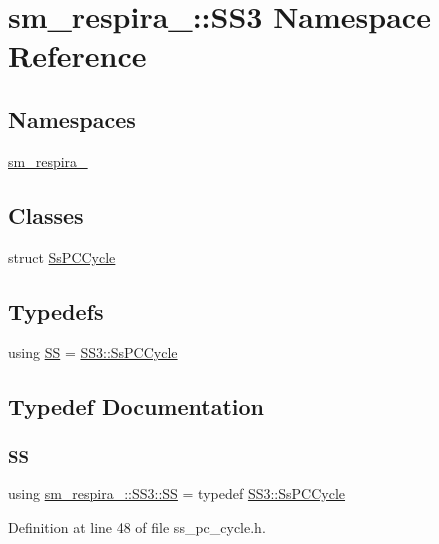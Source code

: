 \hypertarget{namespacesm__respira__1_1_1SS3}{}\section{sm\+\_\+respira\+\_\+:\+:S\+S3 Namespace Reference}
\label{namespacesm__respira__1_1_1SS3}
\subsection*{Namespaces}
\begin{DoxyCompactItemize}
\item 
 \hyperlink{namespacesm__respira__1_1_1SS3_1_1sm__respira__1}{sm\+\_\+respira\+\_}
\end{DoxyCompactItemize}
\subsection*{Classes}
\begin{DoxyCompactItemize}
\item 
struct \hyperlink{structsm__respira__1_1_1SS3_1_1SsPCCycle}{Ss\+P\+C\+Cycle}
\end{DoxyCompactItemize}
\subsection*{Typedefs}
\begin{DoxyCompactItemize}
\item 
using \hyperlink{namespacesm__respira__1_1_1SS3_aca7eacdb113aa4d7f626c75721a4899b}{SS} = \hyperlink{structsm__respira__1_1_1SS3_1_1SsPCCycle}{S\+S3\+::\+Ss\+P\+C\+Cycle}
\end{DoxyCompactItemize}


\subsection{Typedef Documentation}
\mbox{\label{namespacesm__respira__1_1_1SS3_aca7eacdb113aa4d7f626c75721a4899b}} 
\subsubsection{\texorpdfstring{SS}{SS}}
{\footnotesize\ttfamily using \hyperlink{namespacesm__respira__1_1_1SS3_aca7eacdb113aa4d7f626c75721a4899b}{sm\+\_\+respira\+\_\+::\+S\+S3\+::\+SS} = typedef \hyperlink{structsm__respira__1_1_1SS3_1_1SsPCCycle}{S\+S3\+::\+Ss\+P\+C\+Cycle}}



Definition at line 48 of file ss\+\_\+pc\+\_\+cycle.\+h.

